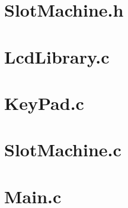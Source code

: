 \documentclass[a4paper,13pt,openany,sffamily]{memoir}
\begin{document}
\section{SlotMachine.h}
\begin{small}

\end{small}


\section{LcdLibrary.c}
\begin{small}

\end{small}


\section{KeyPad.c}
\begin{small}

\end{small}


\section{SlotMachine.c}
\begin{small}

\end{small}


\section{Main.c}
\begin{small}

\end{small}
\end{document}
